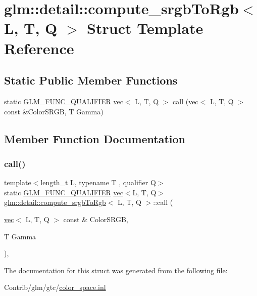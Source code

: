 \hypertarget{structglm_1_1detail_1_1compute__srgb_to_rgb}{}\section{glm\+:\+:detail\+:\+:compute\+\_\+srgb\+To\+Rgb$<$ L, T, Q $>$ Struct Template Reference}
\label{structglm_1_1detail_1_1compute__srgb_to_rgb}
\subsection*{Static Public Member Functions}
\begin{DoxyCompactItemize}
\item 
static \mbox{\hyperlink{setup_8hpp_a33fdea6f91c5f834105f7415e2a64407}{G\+L\+M\+\_\+\+F\+U\+N\+C\+\_\+\+Q\+U\+A\+L\+I\+F\+I\+ER}} \mbox{\hyperlink{structglm_1_1vec}{vec}}$<$ L, T, Q $>$ \mbox{\hyperlink{structglm_1_1detail_1_1compute__srgb_to_rgb_ab3c2c31d63a2548991596b8e460c4db7}{call}} (\mbox{\hyperlink{structglm_1_1vec}{vec}}$<$ L, T, Q $>$ const \&Color\+S\+R\+GB, T Gamma)
\end{DoxyCompactItemize}


\subsection{Member Function Documentation}
\mbox{\label{structglm_1_1detail_1_1compute__srgb_to_rgb_ab3c2c31d63a2548991596b8e460c4db7}} 
\subsubsection{\texorpdfstring{call()}{call()}}
{\footnotesize\ttfamily template$<$length\+\_\+t L, typename T , qualifier Q$>$ \\
static \mbox{\hyperlink{setup_8hpp_a33fdea6f91c5f834105f7415e2a64407}{G\+L\+M\+\_\+\+F\+U\+N\+C\+\_\+\+Q\+U\+A\+L\+I\+F\+I\+ER}} \mbox{\hyperlink{structglm_1_1vec}{vec}}$<$L, T, Q$>$ \mbox{\hyperlink{structglm_1_1detail_1_1compute__srgb_to_rgb}{glm\+::detail\+::compute\+\_\+srgb\+To\+Rgb}}$<$ L, T, Q $>$\+::call (\begin{DoxyParamCaption}\item[{\mbox{\hyperlink{structglm_1_1vec}{vec}}$<$ L, T, Q $>$ const \&}]{Color\+S\+R\+GB,  }\item[{T}]{Gamma }\end{DoxyParamCaption})\hspace{0.3cm}{\ttfamily [inline]}, {\ttfamily [static]}}



The documentation for this struct was generated from the following file\+:\begin{DoxyCompactItemize}
\item 
Contrib/glm/gtc/\mbox{\hyperlink{gtc_2color__space_8inl}{color\+\_\+space.\+inl}}\end{DoxyCompactItemize}
